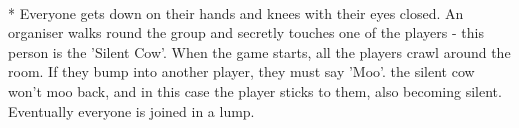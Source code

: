 \begin{minipage}{\textwidth}
\\*
Everyone gets down on their hands and knees with their eyes closed.  An organiser walks round the group and secretly touches one of the players - this person is the 'Silent Cow'.  When the game starts, all the players crawl around the room.  If they bump into another player, they must say 'Moo'.  the silent cow won't moo back, and in this case the player sticks to them, also becoming silent.  Eventually everyone is joined in a lump.
\end{minipage}    \vfill
